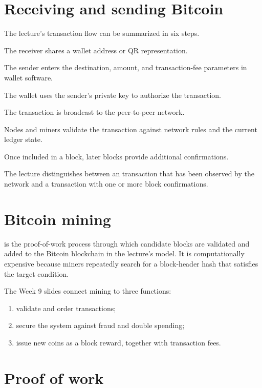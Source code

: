 \section{Receiving and sending Bitcoin}

The lecture's transaction flow can be summarized in six steps.

\begin{utpsteps}
  \item The receiver shares a wallet address or QR representation.
  \item The sender enters the destination, amount, and transaction-fee parameters in wallet software.
  \item The wallet uses the sender's private key to authorize the transaction.
  \item The transaction is broadcast to the peer-to-peer network.
  \item Nodes and miners validate the transaction against network rules and the current ledger state.
  \item Once included in a block, later blocks provide additional confirmations.
\end{utpsteps}

The lecture distinguishes between an  transaction that has been observed by the network and a transaction with one or more block confirmations.

\section{Bitcoin mining}

 is the proof-of-work process through which candidate blocks are validated and added to the Bitcoin blockchain in the lecture's model. It is computationally expensive because miners repeatedly search for a block-header hash that satisfies the target condition.

The Week 9 slides connect mining to three functions:

\begin{enumerate}
  \item validate and order transactions;
  \item secure the system against fraud and double spending;
  \item issue new coins as a block reward, together with transaction fees.
\end{enumerate}

\section{Proof of work}

